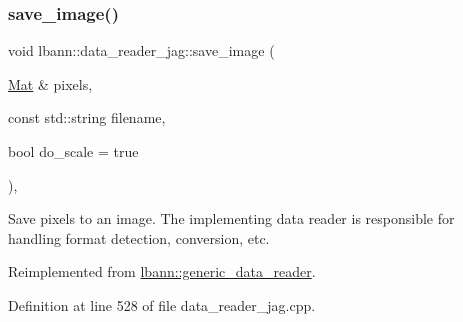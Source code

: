 \mbox{\label{classlbann_1_1data__reader__jag_a396e7456d926ae9045011e7f28284946}} 
\subsubsection{\texorpdfstring{save\+\_\+image()}{save\_image()}}
{\footnotesize\ttfamily void lbann\+::data\+\_\+reader\+\_\+jag\+::save\+\_\+image (\begin{DoxyParamCaption}\item[{\hyperlink{base_8hpp_a68f11fdc31b62516cb310831bbe54d73}{Mat} \&}]{pixels,  }\item[{const std\+::string}]{filename,  }\item[{bool}]{do\+\_\+scale = {\ttfamily true} }\end{DoxyParamCaption})\hspace{0.3cm}{\ttfamily [override]}, {\ttfamily [virtual]}}

Save pixels to an image. The implementing data reader is responsible for handling format detection, conversion, etc. 

Reimplemented from \hyperlink{classlbann_1_1generic__data__reader_a8cf298061c73f55e2fe717acd2a9f178}{lbann\+::generic\+\_\+data\+\_\+reader}.



Definition at line 528 of file data\+\_\+reader\+\_\+jag.\+cpp.


